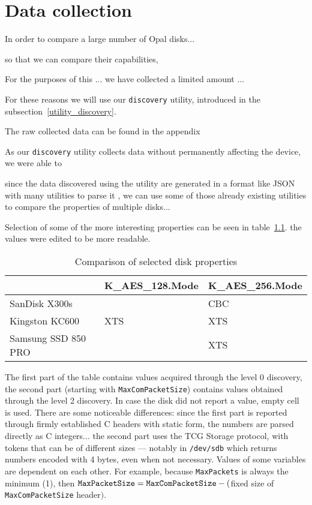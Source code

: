 \chapter{Data collection}

In order to compare a large number of Opal disks...

so that we can compare their capabilities, 

For the purposes of this ... we have collected a limited amount ...

For these reasons we will use our \verb|discovery| utility, introduced in the subsection~\ref{utility_discovery}.

The raw collected data can be found in the appendix

As our \verb|discovery| utility collects data without permanently affecting the device, we were able to 

since the data discovered using the utility are generated in a format like JSON with many utilities to parse it , we can use some of those already existing utilities to compare the properties of multiple disks...

Selection of some of the more interesting properties can be seen in table~\ref{fig:properties_table}. the values were edited to be more readable.



    \begin{table}[]
    \centering
\begin{tabular}{|l|l|l|}
\hline
                    & K\_AES\_128.Mode & K\_AES\_256.Mode \\ \hline
SanDisk X300s       &                  & CBC              \\ \hline
Kingston KC600      & XTS              & XTS              \\ \hline
Samsung SSD 850 PRO &                  & XTS              \\ \hline
\end{tabular}
    \caption{Comparison of selected disk properties}
    \label{fig:properties_table}
\end{table}




The first part of the table contains values acquired through the level 0 discovery, the second part (starting with \verb|MaxComPacketSize|) contains values obtained through the level 2 discovery. In case the disk did not report a value, empty cell is used.
There are some noticeable differences: since the first part is reported through firmly established C headers with static form, the numbers are parsed directly as C integers... the second part uses the TCG Storage protocol, with tokens that can be of different sizes --- notably in \verb|/dev/sdb| which returns numbers encoded with 4 bytes, even when not necessary.
Values of some variables are dependent on each other. For example, because \verb|MaxPackets| is always the minimum (1), then $\verb|MaxPacketSize| = \verb|MaxComPacketSize| - ($fixed size of \verb|MaxComPacketSize| header$)$.




